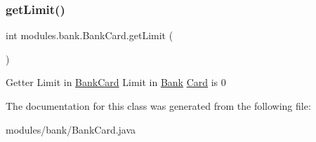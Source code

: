 \subsubsection{\texorpdfstring{get\+Limit()}{getLimit()}}
{\footnotesize\ttfamily int modules.\+bank.\+Bank\+Card.\+get\+Limit (\begin{DoxyParamCaption}{ }\end{DoxyParamCaption})\hspace{0.3cm}{\ttfamily [inline]}}

Getter Limit in \mbox{\hyperlink{classmodules_1_1bank_1_1_bank_card}{Bank\+Card}} Limit in \mbox{\hyperlink{classmodules_1_1bank_1_1_bank}{Bank}} \mbox{\hyperlink{classmodules_1_1bank_1_1_card}{Card}} is 0 

The documentation for this class was generated from the following file\+:\begin{DoxyCompactItemize}
\item 
modules/bank/Bank\+Card.\+java\end{DoxyCompactItemize}
